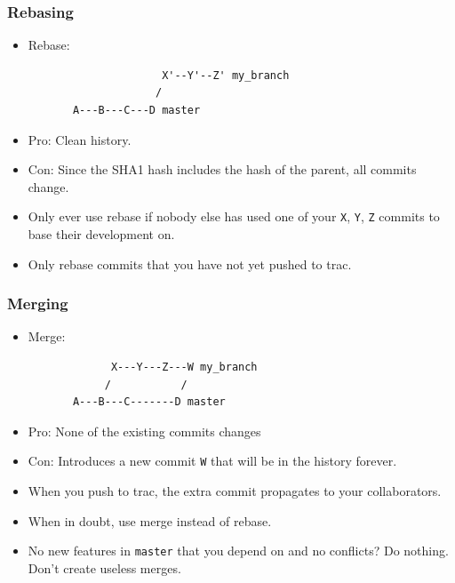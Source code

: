 \begin{frame}[fragile]
  \frametitle{Rebasing}
  
    \begin{itemize}
    \item<1-> Rebase: 
\begin{verbatim}
                     X'--Y'--Z' my_branch
                    /
       A---B---C---D master
\end{verbatim}
    \item<2-> Pro: Clean history.
    \item<3-> Con: Since the SHA1 hash includes the hash of the parent,
      all commits change.
    \item<4-> Only ever use rebase if nobody else has used one of your
      \texttt{X}, \texttt{Y}, \texttt{Z} commits to base their
      development on.
    \item<5-> Only rebase commits that you have not yet pushed to trac.
  \end{itemize}
  
\end{frame}





\begin{frame}[fragile]
  \frametitle{Merging}
  
    \begin{itemize}
  \item<1-> Merge: 
\begin{verbatim}
             X---Y---Z---W my_branch
            /           /
       A---B---C-------D master
\end{verbatim}
      \item<2-> Pro: None of the existing commits changes
      \item<3-> Con: Introduces a new commit \texttt{W} that will be in the
         history forever.
      \item<4-> When you push to trac, the extra commit propagates to your
        collaborators. 
      \item<5-> When in doubt, use merge instead of rebase.
      \item<6-> No new features in \texttt{master} that you depend on and
        no conflicts? Do nothing. Don't create useless merges.
  \end{itemize}
  
\end{frame}




